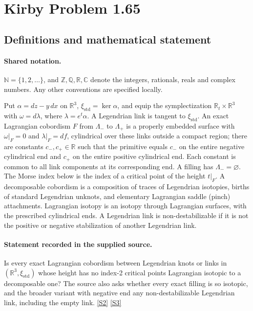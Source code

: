 \documentclass[11pt]{article}
\newcommand{\sref}[2]{\hyperlink{source:#1:#2}{[S#2]}}
\begin{document}
\section{Kirby Problem 1.65}\label{statement}

\subsection{Definitions and mathematical statement}

\paragraph{Shared notation.}$\mathbb N=\{1,2,\ldots\}$, and $\mathbb Z,\mathbb Q,\mathbb R,\mathbb C$ denote the integers, rationals, reals and complex numbers. Any other conventions are specified locally.


Put $\alpha=dz-y\,dx$ on $\mathbb R^3$, $\xi_{\mathrm{std}}=\ker\alpha$, and equip the symplectization $\mathbb R_t\times\mathbb R^3$ with $\omega=d\lambda$, where $\lambda=e^t\alpha$. A Legendrian link is tangent to $\xi_{\mathrm{std}}$. An exact Lagrangian cobordism $F$ from $\Lambda_-$ to $\Lambda_+$ is a properly embedded surface with $\omega|_F=0$ and $\lambda|_F=df$, cylindrical over these links outside a compact region; there are constants $c_-,c_+\in\mathbb R$ such that the primitive equals $c_-$ on the entire negative cylindrical end and $c_+$ on the entire positive cylindrical end. Each constant is common to all link components at its corresponding end. A filling has $\Lambda_-=\varnothing$. The Morse index below is the index of a critical point of the height $t|_F$. A decomposable cobordism is a composition of traces of Legendrian isotopies, births of standard Legendrian unknots, and elementary Lagrangian saddle (pinch) attachments. Lagrangian isotopy is an isotopy through Lagrangian surfaces, with the prescribed cylindrical ends. A Legendrian link is non-destabilizable if it is not the positive or negative stabilization of another Legendrian link.
\paragraph{Statement recorded in the supplied source.}
Is every exact Lagrangian cobordism between Legendrian knots or links in $(\mathbb R^3,\xi_{\mathrm{std}})$ whose height has no index-2 critical points Lagrangian isotopic to a decomposable one? The source also asks whether every exact filling is so isotopic, and the broader variant with negative end any non-destabilizable Legendrian link, including the empty link. \sref{statement}{2} \sref{statement}{3}
\end{document}
